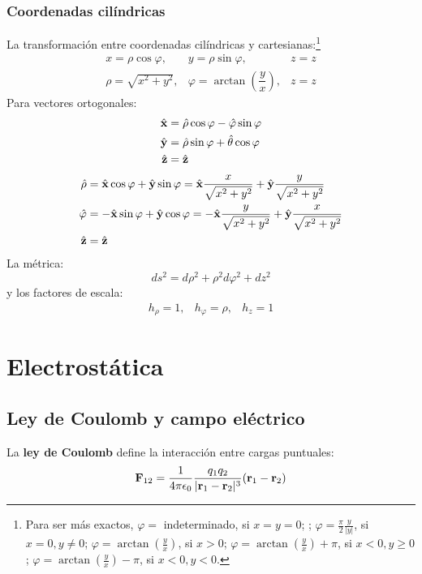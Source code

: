 \documentclass[]{article}
\numberwithin{equation}{section}
\begin{document}
\subsubsection{Coordenadas cilíndricas}
La transformación entre coordenadas cilíndricas y cartesianas:\footnote{Para ser más exactos, \(\varphi = \) indeterminado, si \(x=y=0\); ; \(\varphi = \frac{\pi}{2}\frac{y}{|y|}\), si \(x=0, y\neq 0\); \(\varphi = \arctan\left(\frac{y}{x}\right)\), si \(x>0\); \(\varphi = \arctan\left(\frac{y}{x}\right) + \pi\), si \(x<0, y\geq0\); \(\varphi = \arctan\left(\frac{y}{x}\right) - \pi\), si \(x<0, y<0\). }
\begin{equation}
	\begin{matrix}
		x = \rho\cos\varphi,& y = \rho\sin\varphi,& z = z\\
		\rho = \sqrt{x^2 + y^2},& \varphi = \arctan\left(\dfrac{y}{x}\right), & z = z
	\end{matrix}
\end{equation}
Para vectores ortogonales:
\begin{align}
	\hat{\mathbf{x}} &= \hat{\mathbf{\rho}}\cos\varphi - \hat{\mathbf{\varphi}}\sin\varphi \\
	\hat{\mathbf{y}} &= \hat{\mathbf{\rho}}\sin\varphi + \hat{\mathbf{\theta}}\cos\varphi \\
	\hat{\mathbf{z}} &= \hat{\mathbf{z}}
\end{align}
\begin{align}
	\hat{\mathbf{\rho}} &= \hat{\mathbf{x}}\cos\varphi + \hat{\mathbf{y}}\sin\varphi = \hat{\mathbf{x}}\dfrac{x}{\sqrt{x^2+y^2}} + \hat{\mathbf{y}}\dfrac{y}{\sqrt{x^2+y^2}}\\
	\hat{\mathbf{\varphi}}  &= -\hat{\mathbf{x}}\sin\varphi + \hat{\mathbf{y}}\cos\varphi = -\hat{\mathbf{x}}\dfrac{y}{\sqrt{x^2+y^2}} + \hat{\mathbf{y}}\dfrac{x}{\sqrt{x^2+y^2}}\\
	\hat{\mathbf{z}}  &= \hat{\mathbf{z}}
\end{align}
La métrica:
\begin{equation}
	ds^2 = d\rho^2 + \rho^2 d\varphi^2 + dz^2
\end{equation}
y los factores de escala:
\begin{equation}
	\begin{matrix}
		h_\rho = 1, & h_\varphi = \rho, & h_z = 1
	\end{matrix}
\end{equation}
	
\section{Electrostática}
\subsection{Ley de Coulomb y campo eléctrico}
La \textbf{ley de Coulomb} define la interacción entre cargas puntuales:
\begin{equation}
	\mathbf{F}_{12} = \ke\frac{q_1q_2}{|\rv_1 - \rv_2|^3}(\rv_1 - \rv_2)
\end{equation}
\end{document}
